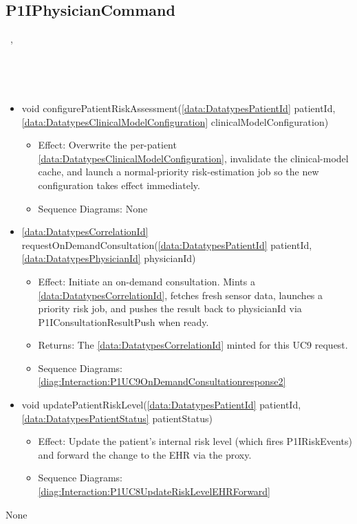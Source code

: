   \subsection{P1IPhysicianCommand}\label{int:InterfacesP1IPhysicianCommand}
    \begin{description}
      \item[Provided by:] \iconcomponent{}~, \iconcomponent{}~
      \item[Required by:] \iconcomponent{}~ 
      \item[Operations:] ~
    \begin{itemize}[noitemsep,nolistsep,leftmargin=-.25cm]
      \item \textsf{void configurePatientRiskAssessment(\ref{data:DatatypesPatientId} patientId, \ref{data:DatatypesClinicalModelConfiguration} clinicalModelConfiguration)}
        \begin{itemize}[noitemsep,nolistsep]
           \item Effect: Overwrite the per-patient \ref{data:DatatypesClinicalModelConfiguration}, invalidate the clinical-model cache, and launch a normal-priority risk-estimation job so the new configuration takes effect immediately. 
           \item Sequence Diagrams: None
        \end{itemize}
      \item \textsf{\ref{data:DatatypesCorrelationId} requestOnDemandConsultation(\ref{data:DatatypesPatientId} patientId, \ref{data:DatatypesPhysicianId} physicianId)}
        \begin{itemize}[noitemsep,nolistsep]
           \item Effect: Initiate an on-demand consultation. Mints a \ref{data:DatatypesCorrelationId}, fetches fresh sensor data, launches a priority risk job, and pushes the result back to physicianId via P1IConsultationResultPush when ready. 
           \item Returns: The \ref{data:DatatypesCorrelationId} minted for this UC9 request.
           \item Sequence Diagrams: \cref{diag:Interaction:P1UC9OnDemandConsultationresponse2}
        \end{itemize}
      \item \textsf{void updatePatientRiskLevel(\ref{data:DatatypesPatientId} patientId, \ref{data:DatatypesPatientStatus} patientStatus)}
        \begin{itemize}[noitemsep,nolistsep]
           \item Effect: Update the patient's internal risk level (which fires P1IRiskEvents) and forward the change to the EHR via the  proxy. 
           \item Sequence Diagrams: \cref{diag:Interaction:P1UC8UpdateRiskLevelEHRForward}
        \end{itemize}
    \end{itemize}
      \item[Diagrams:] None
    \end{description}

